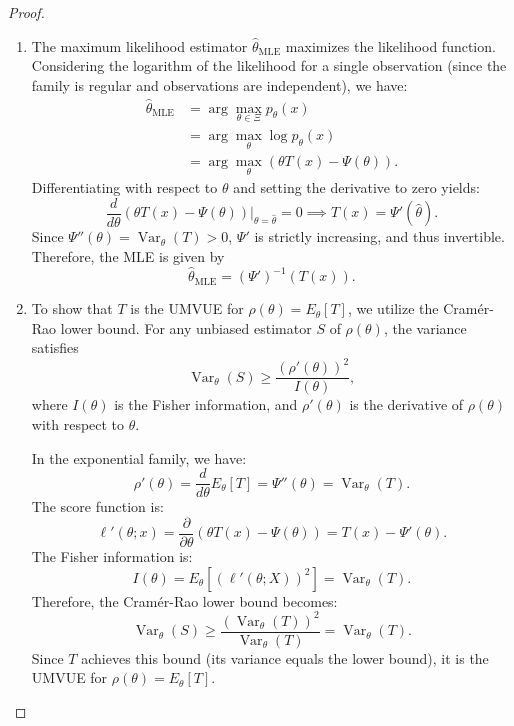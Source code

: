 \documentclass[open=any, 11pt,paper=A4]{scrreprt}
\begin{document}
\begin{proof}
\begin{enumerate}
    \item The maximum likelihood estimator $\hat{\theta}_{\text{MLE}}$ maximizes the likelihood function. Considering the logarithm of the likelihood for a single observation (since the family is regular and observations are independent), we have:
    \begin{align*}
    \hat{\theta}_{\text{MLE}} &= \arg\max_{\theta \in \Xi} p_\theta(x) \\
    &= \arg\max_{\theta} \log p_\theta(x) \\
    &= \arg\max_{\theta} \left( \theta T(x) - \Psi(\theta) \right).
    \end{align*}
    Differentiating with respect to $\theta$ and setting the derivative to zero yields:
    \[
    \frac{d}{d\theta} \left( \theta T(x) - \Psi(\theta) \right) \bigg|_{\theta = \hat{\theta}} = 0 \implies T(x) = \Psi'(\hat{\theta}).
    \]
    Since $\Psi''(\theta) = \operatorname{Var}_\theta(T) > 0$, $\Psi'$ is strictly increasing, and thus invertible. Therefore, the MLE is given by
    \[
    \hat{\theta}_{\text{MLE}} = (\Psi')^{-1}(T(x)).
    \]

    \item To show that $T$ is the UMVUE for $\rho(\theta) = E_\theta[T]$, we utilize the Cramér-Rao lower bound. For any unbiased estimator $S$ of $\rho(\theta)$, the variance satisfies
    \[
    \operatorname{Var}_\theta(S) \geq \frac{(\rho'(\theta))^2}{I(\theta)},
    \]
    where $I(\theta)$ is the Fisher information, and $\rho'(\theta)$ is the derivative of $\rho(\theta)$ with respect to $\theta$.

    In the exponential family, we have:
    \[
    \rho'(\theta) = \frac{d}{d\theta} E_\theta[T] = \Psi''(\theta) = \operatorname{Var}_\theta(T).
    \]
    The score function is:
    \[
    \ell'(\theta; x) = \frac{\partial}{\partial \theta} \left( \theta T(x) - \Psi(\theta) \right) = T(x) - \Psi'(\theta).
    \]
    The Fisher information is:
    \[
    I(\theta) = E_\theta \left[ \left( \ell'(\theta; X) \right)^2 \right] = \operatorname{Var}_\theta(T).
    \]
    Therefore, the Cramér-Rao lower bound becomes:
    \[
    \operatorname{Var}_\theta(S) \geq \frac{(\operatorname{Var}_\theta(T))^2}{\operatorname{Var}_\theta(T)} = \operatorname{Var}_\theta(T).
    \]
    Since $T$ achieves this bound (its variance equals the lower bound), it is the UMVUE for $\rho(\theta) = E_\theta[T]$.
\end{enumerate}
\end{proof}
\end{document}
